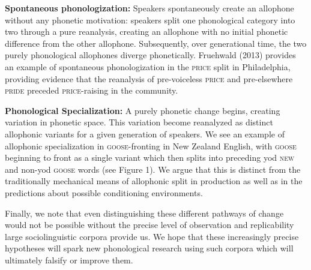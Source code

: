 \documentclass[a4paper,aps,prl,12pt,tightenlines,superscriptaddress]{revtex4}
\begin{document}
\textbf{Spontaneous phonologization:} Speakers spontaneously create an allophone without any phonetic motivation: speakers split one phonological category into two through a pure reanalysis, creating an allophone with no initial phonetic difference from the other allophone. Subsequently, over generational time, the two purely phonological allophones diverge phonetically. Fruehwald (2013) provides an example of spontaneous phonologization in the \textsc{price} split in Philadelphia, providing evidence that the reanalysis of pre-voiceless \textsc{price} and pre-elsewhere \textsc{pride} preceded \textsc{price}-raising in the community.

\textbf{Phonological Specialization:} %
A purely phonetic change begins, creating variation in phonetic space. This variation become reanalyzed as distinct allophonic variants for a given generation of speakers. We see an example of allophonic specialization in \textsc{goose}-fronting in New Zealand English, with \textsc{goose} beginning to front as a single variant which then splits into preceding yod \textsc{new} and non-yod \textsc{goose} words (see Figure 1). We argue that this is distinct from the traditionally mechanical means of allophonic split in production as well as in the predictions about possible conditioning environments.

Finally, we note that even distinguishing these different pathways of change would not be possible without the precise level of observation and replicability large sociolinguistic corpora provide us. We hope that these increasingly precise hypotheses will spark new phonological research using such corpora which will ultimately falsify or improve them.
\end{document}
